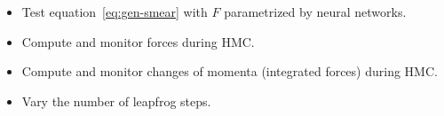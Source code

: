 \begin{itemize}
\item Test equation~\eqref{eq:gen-smear} with $F$ parametrized by neural networks.
\item Compute and monitor forces during HMC.
\item Compute and monitor changes of momenta (integrated forces) during HMC.
\item Vary the number of leapfrog steps.
\end{itemize}
